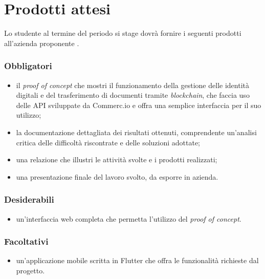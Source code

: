 
\section{Prodotti attesi}
	Lo studente al termine del periodo si stage dovrà fornire i seguenti prodotti all'azienda proponente \ragioneSocAzienda.
	\subsubsection*{Obbligatori}
	\begin{itemize}
		\item il \textit{proof of concept} che mostri il funzionamento della gestione delle identità digitali e del trasferimento di documenti tramite \textit{blockchain}, che faccia uso delle API sviluppate da Commerc.io e offra una semplice interfaccia per il suo utilizzo;
		\item la documentazione dettagliata dei risultati ottenuti, comprendente un'analisi critica delle difficoltà riscontrate e delle soluzioni adottate;
		\item una relazione che illustri le attività svolte e i prodotti realizzati;
		\item una presentazione finale del lavoro svolto, da esporre in azienda.
	\end{itemize}
	
	\subsubsection*{Desiderabili}
	\begin{itemize}
		\item un'interfaccia web completa che permetta l'utilizzo del \textit{proof of concept}.
	\end{itemize}
	
	\subsubsection*{Facoltativi}
	\begin{itemize}
		\item un'applicazione mobile scritta in Flutter che offra le funzionalità richieste dal progetto.
	\end{itemize} 
